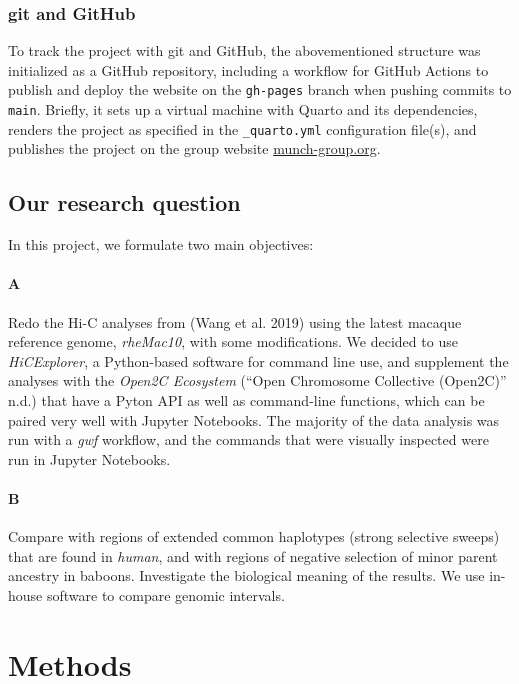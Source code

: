 \documentclass[
  11pt,
  a4paper,
]{scrbook}
\let\oldemph\emph
\renewcommand\emph[1]{\oldemph{\color{gray}#1}}
\begin{document}
\subsection{git and GitHub}\label{git-and-github}

To track the project with git and GitHub, the abovementioned structure
was initialized as a GitHub repository, including a workflow for GitHub
Actions to publish and deploy the website on the \texttt{gh-pages}
branch when pushing commits to \texttt{main}. Briefly, it sets up a
virtual machine with Quarto and its dependencies, renders the project as
specified in the \texttt{\_quarto.yml} configuration file(s), and
publishes the project on the group website
\href{https://munch-group.org/hic-spermatogenesis}{munch-group.org}.

\section{Our research question}\label{our-research-question}

In this project, we formulate two main objectives:

\subsubsection{A}\label{a}

Redo the Hi-C analyses from (Wang et al. 2019) using the latest macaque
reference genome, \emph{rheMac10}, with some modifications. We decided
to use \emph{HiCExplorer}, a Python-based software for command line use,
and supplement the analyses with the \emph{Open2C Ecosystem} ({``Open
{Chromosome Collective} ({Open2C})''} n.d.) that have a Pyton API as
well as command-line functions, which can be paired very well with
Jupyter Notebooks. The majority of the data analysis was run with a
\emph{gwf} workflow, and the commands that were visually inspected were
run in Jupyter Notebooks.

\subsubsection{B}\label{b}

Compare with regions of extended common haplotypes (strong selective
sweeps) that are found in \emph{human}, and with regions of negative
selection of minor parent ancestry in baboons. Investigate the
biological meaning of the results. We use in-house software to compare
genomic intervals.

\chapter{Methods}\label{methods}
\end{document}
